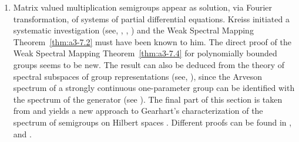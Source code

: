\begin{enumerate}[label=\emph{Section \arabic*:}, wide, itemsep=1ex]
\item 
Matrix valued multiplication semigroups appear as solution, via Fourier transformation, of systems of partial differential equations.
Kreiss initiated a systematic investigation (see, \eg \citet{kreiss:1958}, \citet{kreiss:1959}, \citet{millerstrang:1966}) and the Weak Spectral Mapping Theorem~\ref{thm:a3-7.2} must have been known to him. The direct proof of the Weak Spectral Mapping Theorem~\ref{thm:a3-7.4} for polynomially bounded groups seems to be new. The result can also be deduced from the theory of spectral subspaces of group representations (see, \eg \citet{combesdelaroche:1978}), since the Arveson spectrum of a strongly continuous one-parameter group can be identified with the spectrum of the generator (see \citet{evans:1976}). The final part of this section is taken from \citet{greiner:1985} and yields a new approach to Gearhart's characterization of the spectrum of semigroups on Hilbert spaces \citet{gearhart:1978}. Different proofs can be found in \citet{herbst:1983}, \citet{howland:1984} and \citet{pruess:1984}. 
\end{enumerate}

\RaggedRight

 

